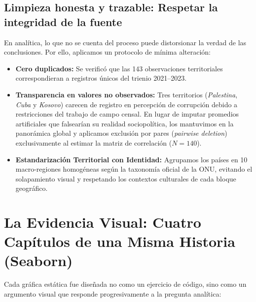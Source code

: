 \documentclass[9.5pt, a4paper]{article}
\begin{document}
\subsection{Limpieza honesta y trazable: Respetar la integridad de la fuente}
En analítica, lo que no se cuenta del proceso puede distorsionar la verdad de las conclusiones. Por ello, aplicamos un protocolo de mínima alteración:
\begin{itemize}
    \item \textbf{Cero duplicados:} Se verificó que las 143 observaciones territoriales correspondieran a registros únicos del trienio 2021--2023.
    \item \textbf{Transparencia en valores no observados:} Tres territorios (\textit{Palestina}, \textit{Cuba} y \textit{Kosovo}) carecen de registro en percepción de corrupción debido a restricciones del trabajo de campo censal. En lugar de imputar promedios artificiales que falsearían su realidad sociopolítica, los mantuvimos en la panorámica global y aplicamos exclusión por pares (\textit{pairwise deletion}) exclusivamente al estimar la matriz de correlación ($N = 140$).
    \item \textbf{Estandarización Territorial con Identidad:} Agrupamos los países en 10 macro-regiones homogéneas según la taxonomía oficial de la ONU, evitando el solapamiento visual y respetando los contextos culturales de cada bloque geográfico.
\end{itemize}

\section{La Evidencia Visual: Cuatro Capítulos de una Misma Historia (Seaborn)}

Cada gráfica estática fue diseñada no como un ejercicio de código, sino como un argumento visual que responde progresivamente a la pregunta analítica:
\end{document}
